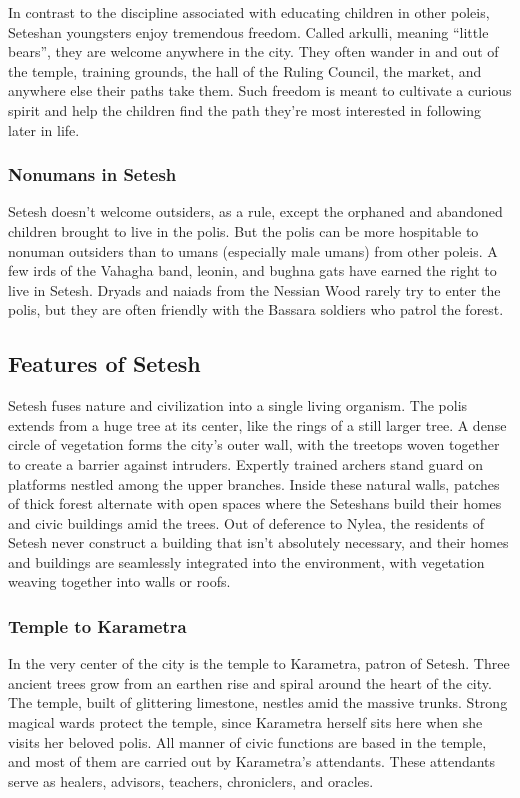         In contrast to the discipline associated with educating children in other poleis, Seteshan youngsters enjoy tremendous freedom.
        Called arkulli, meaning ``little bears'', they are welcome anywhere in the city.
        They often wander in and out of the temple, training grounds, the hall of the Ruling Council, the market, and anywhere else their paths take them.
        Such freedom is meant to cultivate a curious spirit and help the children find the path they're most interested in following later in life.

    \subsubsection{Nonumans in Setesh}
        Setesh doesn't welcome outsiders, as a rule, except the orphaned and abandoned children brought to live in the polis.
        But the polis can be more hospitable to nonuman outsiders than to umans (especially male umans) from other poleis.
        A few irds of the Vahagha band, leonin, and bughna gats have earned the right to live in Setesh.
        Dryads and naiads from the Nessian Wood rarely try to enter the polis, but they are often friendly with the Bassara soldiers who patrol the forest.

\subsection*{Features of Setesh}
    Setesh fuses nature and civilization into a single living organism.
    The polis extends from a huge tree at its center, like the rings of a still larger tree.
    A dense circle of vegetation forms the city's outer wall, with the treetops woven together to create a barrier against intruders.
    Expertly trained archers stand guard on platforms nestled among the upper branches.
    Inside these natural walls, patches of thick forest alternate with open spaces where the Seteshans build their homes and civic buildings amid the trees.
    Out of deference to Nylea, the residents of Setesh never construct a building that isn't absolutely necessary, and their homes and buildings are seamlessly integrated into the environment, with vegetation weaving together into walls or roofs.

    \subsubsection{Temple to Karametra}
        In the very center of the city is the temple to Karametra, patron of Setesh.
        Three ancient trees grow from an earthen rise and spiral around the heart of the city.
        The temple, built of glittering limestone, nestles amid the massive trunks.
        Strong magical wards protect the temple, since Karametra herself sits here when she visits her beloved polis.
        All manner of civic functions are based in the temple, and most of them are carried out by Karametra's attendants.
        These attendants serve as healers, advisors, teachers, chroniclers, and oracles.

